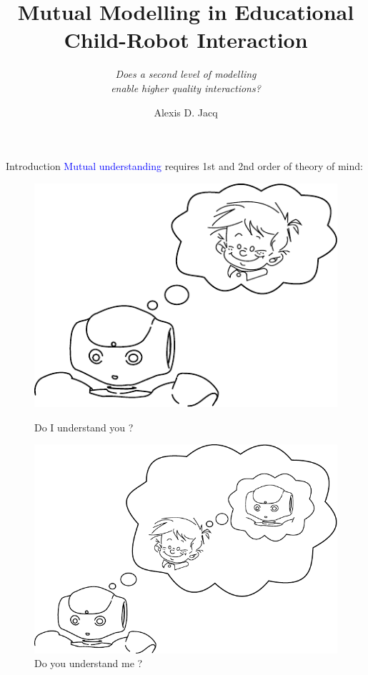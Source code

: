 \documentclass[compress]{beamer}
\title{Mutual Modelling in Educational Child-Robot Interaction}
\subtitle{\textit{Does a second level of modelling\\enable higher quality interactions?}}
\author{Alexis D. Jacq}
\institute{GAIPS INESC-ID {\Medium
IST}\\ \& CHILI lab {\Medium
EPFL}}
\begin{document}
\maketitle



\begin{frame}{Introduction}
\textcolor{blue}{Mutual understanding} requires 1st and 2nd order of theory of mind:
\begin{figure}[!tbp]
	\begin{minipage}[b]{.4\textwidth}
		\includegraphics[width=0.8\columnwidth]{naoMM}
		\caption{Do I understand you ? }
	\end{minipage}
	\hfill
	\begin{minipage}[b]{.4\textwidth}
		\includegraphics[width=0.8\columnwidth]{naoMM2}
		\caption{Do you understand me ? }
	\end{minipage}
	
\end{figure}
\end{frame}
\end{document}
